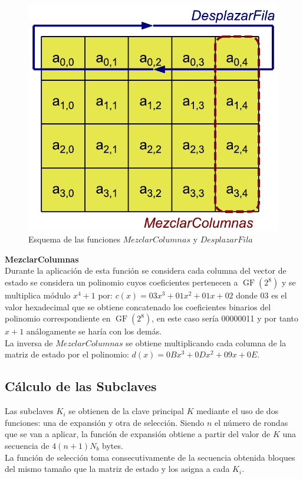 \begin{description}
		\begin{figure}[htb]
			\centering
			\includegraphics[scale=0.4]{imagenes/aesdesplazarmezclar.png} 
			\caption{Esquema de las funciones $MezclarColumnas$ y $DesplazarFila$ \cite{En2011}}
			\label{desplazarymezclar}
		\end{figure}
\newpage
	\item \textbf{MezclarColumnas}\\
		Durante la aplicación de esta función se considera cada columna del vector de estado se considera un polinomio cuyos coeficientes pertenecen a $\operatorname{GF}(2^8)$ y se multiplica módulo $x^4+1$ por: $c(x)=03x^3+01x^2+01x+02$ donde 03 es el valor hexadecimal que se obtiene concatenado los coeficientes binarios del polinomio correspondiente en $\operatorname{GF}(2^8)$, en este caso sería 00000011 y por tanto $x+1$ análogamente se haría con los demás.\\
		La inversa de $MezclarColumnas$ se obtiene multiplicando cada columna de la matriz de estado por el polinomio: $d(x)=0Bx^3+0Dx^2+09x+0E$.

\end{description}

\subsection{Cálculo de las Subclaves}
Las subclaves $K_i$ se obtienen de la clave principal $K$ mediante el uso de dos funciones: una de expansión y otra de selección. Siendo $n$ el número de rondas que se van a aplicar, la función de expansión obtiene a partir del valor de $K$ una secuencia de $4(n+1)N_b$ bytes.\\
La función de selección toma consecutivamente de la secuencia obtenida bloques del mismo tamaño que la matriz de estado y los asigna a cada $K_i$.\\

